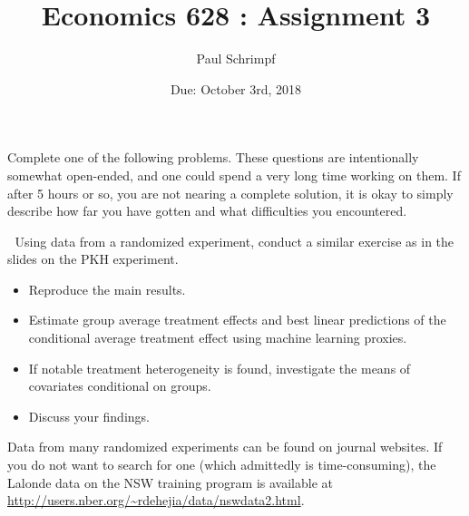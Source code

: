 

\title{Economics 628 : Assignment 3}
\author{Paul Schrimpf}
\date{Due: October 3rd, 2018}


\maketitle

Complete one of the following problems. These questions are
intentionally somewhat open-ended, and one could spend a very long
time working on them. If after 5 hours or so, you are not nearing a
complete solution, it is okay to simply describe how far you have
gotten and what difficulties you encountered. 

\begin{problem}$\;$
  Using data from a randomized experiment, conduct a similar exercise
  as in the slides on the PKH experiment.
  \begin{itemize}
  \item Reproduce the main results.
  \item Estimate group average treatment effects and best linear
    predictions of the conditional average treatment effect using
    machine learning proxies.
  \item If notable treatment heterogeneity is found, investigate the
    means of covariates conditional on groups.
  \item Discuss your findings.
  \end{itemize}
  Data from many randomized experiments can be
  found on journal websites. If you do not want to search for one
  (which admittedly is time-consuming), the Lalonde data on the NSW
  training program is available at
  \url{http://users.nber.org/~rdehejia/data/nswdata2.html}. 
\end{problem}

